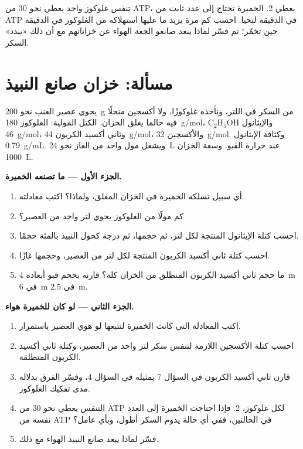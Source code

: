 \begin{exercise}[$\star\star\star$]\label{exo:g10:cell-metabolism:15}
تنفس غلوكوز واحد يعطي نحو 30 من ATP،  يعطي 2.  الخميرة
تحتاج إلى عدد ثابت من ATP في الدقيقة لتحيا. احسب كم مرة يزيد ما عليها
استهلاكه من الغلوكوز في الدقيقة حين تخمّر؛ ثم فسّر لماذا يبعد صانعو
الجعة الهواء عن خزاناتهم مع أن ذلك «يبدد» السكر.
\end{exercise}

\section{مسألة: خزان صانع النبيذ}

\begin{problem}
\label{pb:g10:cell-metabolism:1}
يحوي عصير العنب نحو \qty{200}{g} من السكر في اللتر، ونأخذه غلوكوزًا،
ولا أكسجين منحلًا فيه حالما يغلق الخزان. الكتل المولية: الغلوكوز
\qty{180}{g/mol}، والإيثانول $\mathrm{C_2H_5OH}$ \qty{46}{g/mol}،
وثاني أكسيد الكربون \qty{44}{g/mol}، والأكسجين \qty{32}{g/mol}.
وكثافة الإيثانول \qty{0.79}{g/mL}. ويشغل مول واحد من الغاز نحو
\qty{24}{L} عند حرارة القبو. وسعة الخزان \qty{1000}{L}.

\medskip
\noindent\textbf{الجزء الأول --- ما تصنعه الخميرة.}
\begin{enumerate}
  \item أي سبيل تسلكه الخميرة في الخزان المغلق، ولماذا؟ اكتب معادلته.
  \item كم مولًا من الغلوكوز يحوي لتر واحد من العصير؟
  \item احسب كتلة الإيثانول المنتجة لكل لتر، ثم حجمها، ثم درجة كحول
        النبيذ بالمئة حجمًا.
  \item احسب كتلة ثاني أكسيد الكربون المنتجة لكل لتر من العصير، وحجمها
        غازًا.
  \item ما حجم ثاني أكسيد الكربون المنطلق من الخزان كله؟ قارنه بحجم
        قبو أبعاده \qty{4}{m} في \qty{6}{m} في \qty{2.5}{m}.
\end{enumerate}

\medskip
\noindent\textbf{الجزء الثاني --- لو كان للخميرة هواء.}
\begin{enumerate}[resume]
  \item اكتب المعادلة التي كانت الخميرة لتتبعها لو هوي العصير
        باستمرار.
  \item احسب كتلة الأكسجين اللازمة لتنفس سكر لتر واحد من العصير، وكتلة
        ثاني أكسيد الكربون المنطلقة.
  \item قارن ثاني أكسيد الكربون في السؤال 7 بمثيله في السؤال 4، وفسّر
        الفرق بدلالة مدى تفكيك الغلوكوز.
  \item التنفس يعطي نحو 30 من ATP لكل غلوكوز،  2. فإذا احتاجت
        الخميرة إلى العدد نفسه من ATP في الحالتين، ففي أي حالة يدوم
        السكر أطول، وبأي عامل؟
  \item فسّر لماذا يبعد صانع النبيذ الهواء مع ذلك.
\end{enumerate}


\end{problem}
